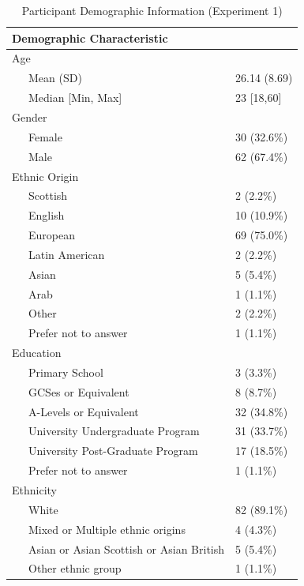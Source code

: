 \documentclass[
  donotrepeattitle,doc, 12pt, a4paper,floatsintext]{apa7}
\begin{document}
\begin{table}[tbp]

\begin{center}
\begin{threeparttable}

\caption{\label{tab:unnamed-chunk-8}Participant Demographic Information (Experiment 1)}

\begin{tabular}{ll}
\toprule
Demographic Characteristic & \\
\midrule
Age & \\
\ \ \ Mean (SD) & 26.14 (8.69)\\
\ \ \ Median [Min, Max] & 23 [18,60]\\
Gender & \\
\ \ \ Female & 30 (32.6\%)\\
\ \ \ Male & 62 (67.4\%)\\
Ethnic Origin & \\
\ \ \ Scottish & 2 (2.2\%)\\
\ \ \ English & 10 (10.9\%)\\
\ \ \ European & 69 (75.0\%)\\
\ \ \ Latin American & 2 (2.2\%)\\
\ \ \ Asian & 5 (5.4\%)\\
\ \ \ Arab & 1 (1.1\%)\\
\ \ \ Other & 2 (2.2\%)\\
\ \ \ Prefer not to answer & 1 (1.1\%)\\
Education & \\
\ \ \ Primary School & 3 (3.3\%)\\
\ \ \ GCSes or Equivalent & 8 (8.7\%)\\
\ \ \ A-Levels or Equivalent & 32 (34.8\%)\\
\ \ \ University Undergraduate Program & 31 (33.7\%)\\
\ \ \ University Post-Graduate Program & 17 (18.5\%)\\
\ \ \ Prefer not to answer & 1 (1.1\%)\\
Ethnicity & \\
\ \ \ White & 82 (89.1\%)\\
\ \ \ Mixed or Multiple ethnic origins & 4 (4.3\%)\\
\ \ \ Asian or Asian Scottish or Asian British & 5 (5.4\%)\\
\ \ \ Other ethnic group & 1 (1.1\%)\\
\bottomrule
\end{tabular}

\end{threeparttable}
\end{center}

\end{table}
\end{document}
